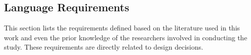\subsection{Language Requirements} \label{ssec_tool:langRequirements}
This section lists the requirements defined based on the literature used in this work and even the prior knowledge of the researchers involved in conducting the study.
These requirements are directly related to design decisions.

